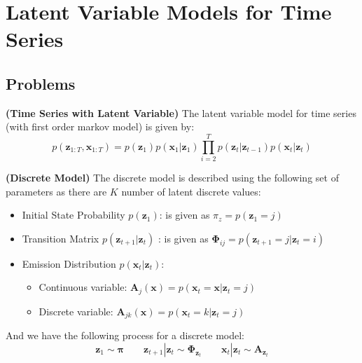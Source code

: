 \section{Latent Variable Models for Time Series}

\subsection{Problems}

\begin{definition}{\textbf{(Time Series with Latent Variable)}}
    The latent variable model for time series (with first order markov model) is given by:
    \begin{equation*}
        p(\boldsymbol z_{1:T}, \boldsymbol x_{1:T}) = p(\boldsymbol z_1)p(\boldsymbol x_1 | \boldsymbol z_1) \prod^T_{i=2}p(\boldsymbol z_t|\boldsymbol z_{t-1})p(\boldsymbol x_t|\boldsymbol z_t)
    \end{equation*}
\end{definition}

\begin{definition}{\textbf{(Discrete Model)}}
    The discrete model is described using the following set of parameters as there are $K$ number of latent discrete values:
    \begin{itemize}
        \item Initial State Probability $p(\boldsymbol z_1)$: is given as $\pi_z = p(\boldsymbol z_1 = j)$
        \item Transition Matrix $p(\boldsymbol z_{t+1} | \boldsymbol z_t)$ : is given as $\boldsymbol \Phi_{ij} = p(\boldsymbol z_{t+1} = j | \boldsymbol z_t = i)$
        \item Emission Distribution $p(\boldsymbol x_t | \boldsymbol z_t)$: 
        \begin{itemize}
            \item Continuous variable: $\boldsymbol A_j(\boldsymbol x) = p(\boldsymbol x_t = \boldsymbol x | \boldsymbol z_t = j)$
            \item Discrete variable: $\boldsymbol A_{jk}(\boldsymbol x) = p(\boldsymbol x_t = k | \boldsymbol z_t = j)$
        \end{itemize}
    \end{itemize}
    And we have the following process for a discrete model:
    \begin{equation*}
        \boldsymbol z_1 \sim \boldsymbol \pi \qquad \boldsymbol z_{t+1} | \boldsymbol z_t \sim \boldsymbol \Phi_{\boldsymbol z_t} \qquad \boldsymbol x_t | \boldsymbol z_t \sim \boldsymbol A_{\boldsymbol z_t}
    \end{equation*}
\end{definition}

